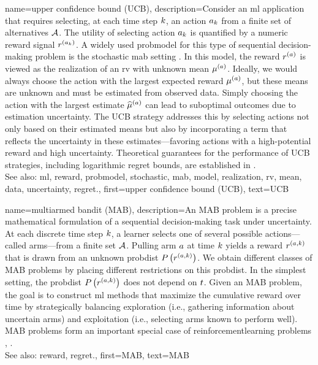 {name={upper confidence bound (UCB)},
	description={Consider an \gls{ml} 
		application that requires selecting, at each time step $k$, an action $a_{k}$ 
		from a finite set of alternatives $\mathcal{A}$. The utility of selecting action $a_{k}$ 
		is quantified by a numeric \gls{reward} signal $r^{(a_{k})}$. 
		A widely used \gls{probmodel} for this type of sequential decision-making problem 
		is the \gls{stochastic} \gls{mab} setting \cite{Bubeck2012}. In this \gls{model}, 
		the \gls{reward} $r^{(a)}$ is viewed as the \gls{realization} of an \gls{rv} 
		with unknown \gls{mean} $\mu^{(a)}$. Ideally, we would always choose the 
		action with the largest expected \gls{reward} $\mu^{(a)}$, but these 
		\glspl{mean} are unknown and must be estimated from observed \gls{data}. Simply 
		choosing the action with the largest estimate $\widehat{\mu}^{(a)}$ can 
		lead to suboptimal outcomes due to estimation \gls{uncertainty}. The UCB strategy 
		addresses this by selecting actions not only based on their estimated \glspl{mean} but 
		also by incorporating a term that reflects the \gls{uncertainty} in these estimates—favoring 
		actions with a high-potential \gls{reward} and high \gls{uncertainty}. Theoretical guarantees 
		for the performance of UCB strategies, including logarithmic \gls{regret} bounds, are established in \cite{Bubeck2012}.
					\\ 
		See also: \gls{ml}, \gls{reward}, \gls{probmodel}, \gls{stochastic}, \gls{mab}, \gls{model}, \gls{realization}, \gls{rv}, \gls{mean}, \gls{data}, \gls{uncertainty}, \gls{regret}.},
	first={upper confidence bound (UCB)},
	text={UCB} 
}

{name={multiarmed bandit (MAB)},
	description={An MAB  problem is a precise mathematical 
		formulation of a sequential decision-making task under \gls{uncertainty}. At each 
		discrete time step $k$, a learner selects one of several possible 
		actions—called arms—from a finite set $\mathcal{A}$. Pulling arm $a$ at time 
		$k$ yields a \gls{reward} $r^{(a,k)}$ that is drawn from an unknown 
		\gls{probdist} $P\left(r^{(a,k)}\right)$. We obtain different classes 
		of MAB problems by placing different restrictions on this \gls{probdist}. In the simplest 
		setting, the \gls{probdist} $P\left(r^{(a,k)}\right)$ does not depend on $t$. 
		Given an MAB problem, the goal is to construct \gls{ml} methods that maximize the cumulative 
		\gls{reward} over time by strategically balancing exploration (i.e., gathering information 
		about uncertain arms) and exploitation (i.e., selecting arms known to perform well). 
		MAB problems form an important special case of \gls{reinforcementlearning} problems \cite{Bubeck2012}, \cite{SuttonEd2}.
					\\ 
		See also: \gls{reward}, \gls{regret}.},
	first={MAB},
	text={MAB}
}



